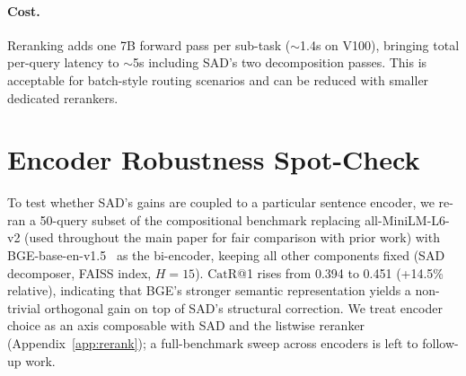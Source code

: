 \documentclass[11pt]{article}
\newcommand{\catrecall}{\text{CatR}}
\begin{document}
\paragraph{Cost.}
Reranking adds one 7B forward pass per sub-task ($\sim$1.4s on V100), bringing total per-query latency to $\sim$5s including SAD's two decomposition passes. This is acceptable for batch-style routing scenarios and can be reduced with smaller dedicated rerankers.

\section{Encoder Robustness Spot-Check}
\label{app:encoder}

To test whether SAD's gains are coupled to a particular sentence encoder, we re-ran a 50-query subset of the compositional benchmark replacing all-MiniLM-L6-v2 (used throughout the main paper for fair comparison with prior work) with BGE-base-en-v1.5~\cite{xiao2024bge} as the bi-encoder, keeping all other components fixed (SAD decomposer, FAISS index, $H{=}15$). $\catrecall$@1 rises from 0.394 to 0.451 (+14.5\% relative), indicating that BGE's stronger semantic representation yields a non-trivial orthogonal gain on top of SAD's structural correction. We treat encoder choice as an axis composable with SAD and the listwise reranker (Appendix~\ref{app:rerank}); a full-benchmark sweep across encoders is left to follow-up work.
\end{document}
